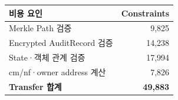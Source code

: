 \begin{tabular}{@{}lr@{}}\toprule
        \textbf{비용 요인}           & \textbf{Constraints} \\
        \midrule
        Merkle Path 검증           & 9,825                \\
        Encrypted AuditRecord 검증 & 14,238               \\
        State·객체 관계 검증           & 17,994               \\
        cm/nf·owner address 계산   & 7,826                \\
        \midrule
        \textbf{Transfer 합계}     & \textbf{49,883}      \\
        \bottomrule
    \end{tabular}
